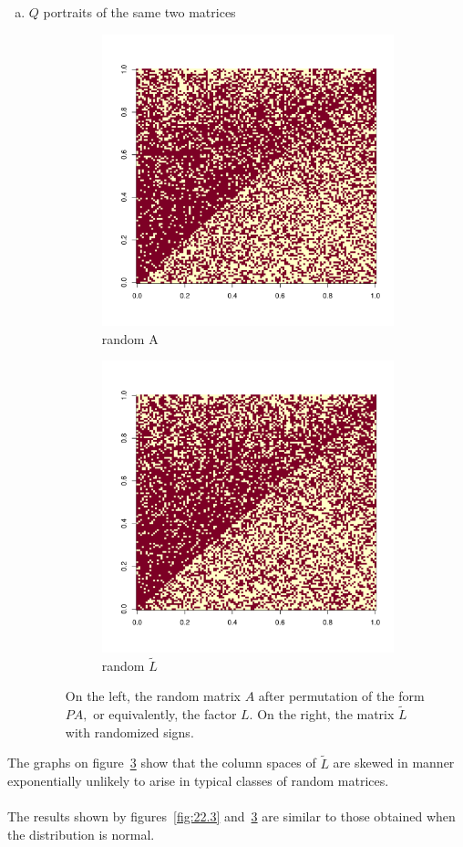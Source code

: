 \documentclass[11pt]{article}
\begin{document}
\begin{enumerate}[(a)]
\pagebreak
\item $Q$ portraits of the same two matrices
\begin{figure}[h]
\centering
  \begin{subfigure}[b]{0.4\textwidth}
    \begin{center}
    \includegraphics[width=7 cm, clip = false]{randomA.pdf}
    \caption{random A }
    \label{fig:22.4.a}
    \end{center}
  \end{subfigure}
\hfill
  \begin{subfigure}[b]{0.4\textwidth}
    \centering
    \includegraphics[width = 7 cm]{randomL.pdf}
    \caption{random $\tilde{L}$}
    \label{fig:22.4.b}
  \end{subfigure}
 \caption{On the left, the random matrix $A$ after permutation of the form $PA,$ or equivalently, the factor $L.$ On the right, the matrix $\tilde{L}$ with randomized signs.}\label{fig:22.4}
\end{figure}
\end{enumerate}
The graphs on figure~\ref{fig:22.4} show that the column spaces of $\tilde{L}$ are skewed in manner exponentially unlikely to arise in typical classes of random matrices.\\\\
The results shown by figures~\ref{fig:22.3} and~\ref{fig:22.4} are similar to those obtained when the distribution is normal.
\end{document}
